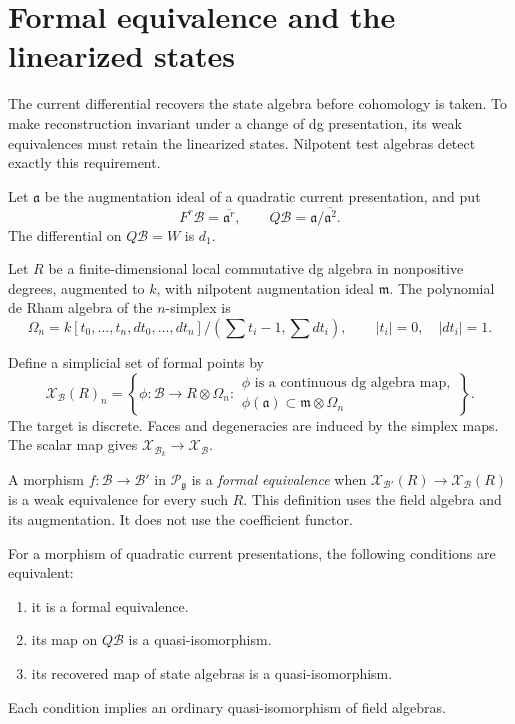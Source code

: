\section{Formal equivalence and the linearized states}
\label{cycmp:sec:formal}

The current differential recovers the state algebra before cohomology
is taken. To make reconstruction invariant under a change of dg
presentation, its weak equivalences must retain the linearized states.
Nilpotent test algebras detect exactly this requirement.

Let $\mathfrak a$ be the augmentation ideal of a quadratic current
presentation, and put
\[
 F^r\mathcal B=\overline{\mathfrak a^r},\qquad
 Q\mathcal B=\mathfrak a/\overline{\mathfrak a^2}.
\]
The differential on $Q\mathcal B=W$ is $d_1$.

Let $R$ be a finite-dimensional local commutative dg algebra in
nonpositive degrees, augmented to $k$, with nilpotent augmentation
ideal $\mathfrak m$. The polynomial de Rham algebra of the
$n$-simplex is
\[
 \Omega_n=k[t_0,\ldots,t_n,dt_0,\ldots,dt_n]
      /(\textstyle\sum t_i-1,\sum dt_i),
 \qquad |t_i|=0,\quad |dt_i|=1.
\]

Define a simplicial set of formal points by
\begin{equation}\label{cycmp:eq:formal-points}
 \mathcal X_{\mathcal B}(R)_n=
 \left\{\phi:\mathcal B\longrightarrow R\otimes\Omega_n:
 \begin{array}{l}
 \phi\text{ is a continuous dg algebra map},\\
 \phi(\mathfrak a)\subset\mathfrak m\otimes\Omega_n
 \end{array}\right\}.
\end{equation}
The target is discrete. Faces and degeneracies are induced by the
simplex maps. The scalar map gives
$\mathcal X_{\mathcal B_k}\to\mathcal X_{\mathcal B}$.

A morphism $f:\mathcal B\to\mathcal B'$ in
$\mathcal P_{\mathfrak g}$ is a \emph{formal equivalence} when
$\mathcal X_{\mathcal B'}(R)\to\mathcal X_{\mathcal B}(R)$ is a
weak equivalence for every such $R$. This definition uses the field
algebra and its augmentation. It does not use the coefficient functor.

\begin{theorem}\label{cycmp:thm:formal-equivalence}
For a morphism of quadratic current presentations, the following
conditions are equivalent:
\begin{enumerate}[label=\textup{(\roman*)}]
\item it is a formal equivalence.
\item its map on $Q\mathcal B$ is a quasi-isomorphism.
\item its recovered map of state algebras is a quasi-isomorphism.
\end{enumerate}
Each condition implies an ordinary quasi-isomorphism of field algebras.
\end{theorem}

